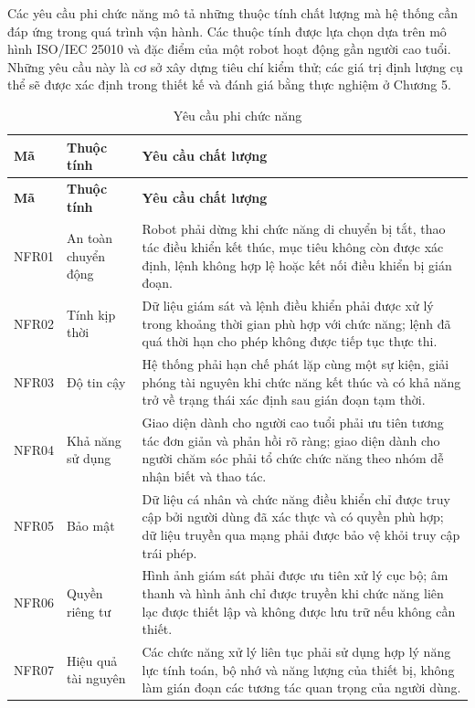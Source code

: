 Các yêu cầu phi chức năng mô tả những thuộc tính chất lượng mà hệ thống cần đáp ứng trong quá trình vận hành. Các thuộc tính được lựa chọn dựa trên mô hình ISO/IEC 25010  và đặc điểm của một robot hoạt động gần người cao tuổi. Những yêu cầu này là cơ sở xây dựng tiêu chí kiểm thử; các giá trị định lượng cụ thể sẽ được xác định trong thiết kế và đánh giá bằng thực nghiệm ở Chương 5.

\begin{longtable}{|p{1.4cm}|p{3.1cm}|p{8.7cm}|}
\caption{Yêu cầu phi chức năng}\label{tab:nonfunctional_requirements}\\
\hline
\textbf{Mã} & \textbf{Thuộc tính} & \textbf{Yêu cầu chất lượng} \\
\hline
\endfirsthead
\hline
\textbf{Mã} & \textbf{Thuộc tính} & \textbf{Yêu cầu chất lượng} \\
\hline
\endhead
NFR01 & An toàn chuyển động & Robot phải dừng khi chức năng di chuyển bị tắt, thao tác điều khiển kết thúc, mục tiêu không còn được xác định, lệnh không hợp lệ hoặc kết nối điều khiển bị gián đoạn. \\
\hline
NFR02 & Tính kịp thời & Dữ liệu giám sát và lệnh điều khiển phải được xử lý trong khoảng thời gian phù hợp với chức năng; lệnh đã quá thời hạn cho phép không được tiếp tục thực thi. \\
\hline
NFR03 & Độ tin cậy & Hệ thống phải hạn chế phát lặp cùng một sự kiện, giải phóng tài nguyên khi chức năng kết thúc và có khả năng trở về trạng thái xác định sau gián đoạn tạm thời. \\
\hline
NFR04 & Khả năng sử dụng & Giao diện dành cho người cao tuổi phải ưu tiên tương tác đơn giản và phản hồi rõ ràng; giao diện dành cho người chăm sóc phải tổ chức chức năng theo nhóm dễ nhận biết và thao tác. \\
\hline
NFR05 & Bảo mật & Dữ liệu cá nhân và chức năng điều khiển chỉ được truy cập bởi người dùng đã xác thực và có quyền phù hợp; dữ liệu truyền qua mạng phải được bảo vệ khỏi truy cập trái phép. \\
\hline
NFR06 & Quyền riêng tư & Hình ảnh giám sát phải được ưu tiên xử lý cục bộ; âm thanh và hình ảnh chỉ được truyền khi chức năng liên lạc được thiết lập và không được lưu trữ nếu không cần thiết. \\
\hline
NFR07 & Hiệu quả tài nguyên & Các chức năng xử lý liên tục phải sử dụng hợp lý năng lực tính toán, bộ nhớ và năng lượng của thiết bị, không làm gián đoạn các tương tác quan trọng của người dùng. \\

\end{longtable}
